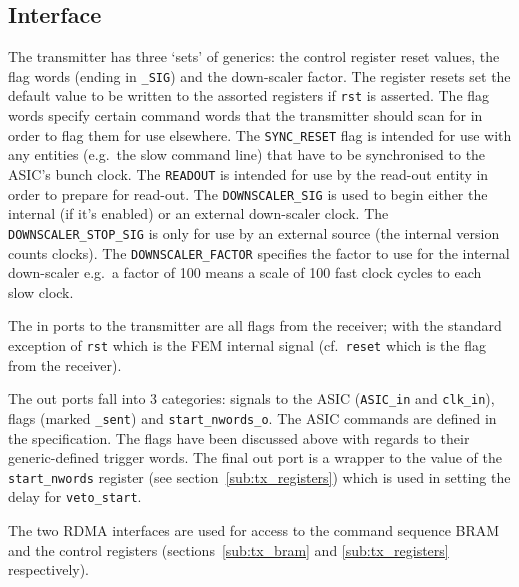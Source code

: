 \subsection{Interface} %
\label{sub:tx_interface}
The transmitter has three `sets' of generics: the control register reset values, the flag words (ending in \texttt{\_SIG}) and the down-scaler factor. The register resets set the default value to be written to the assorted registers if \texttt{rst} is asserted. The flag words specify certain command words that the transmitter should scan for in order to flag them for use elsewhere. The \texttt{SYNC\_RESET} flag is intended for use with any entities (e.g.\ the slow command line) that have to be synchronised to the ASIC's bunch clock. The \texttt{READOUT} is intended for use by the read-out entity in order to prepare for read-out. The \texttt{DOWNSCALER\_SIG} is used to begin either the internal (if it's enabled) or an external down-scaler clock. The \texttt{DOWNSCALER\_STOP\_SIG} is only for use by an external source (the internal version counts clocks). The \texttt{DOWNSCALER\_FACTOR} specifies the factor to use for the internal down-scaler e.g.\ a factor of 100 means a scale of 100 fast clock cycles to each slow clock.
    
The in ports to the transmitter are all flags from the receiver; with the standard exception of \texttt{rst} which is the FEM internal signal (cf.\ \texttt{reset} which is the flag from the receiver).
    
The out ports fall into 3 categories: signals to the ASIC (\texttt{ASIC\_in} and \texttt{clk\_in}), flags (marked \texttt{\_sent}) and \texttt{start\_nwords\_o}. The ASIC commands are defined in the specification. The flags have been discussed above with regards to their generic-defined trigger words. The final out port is a wrapper to the value of the \texttt{start\_nwords} register (see section~\ref{sub:tx_registers}) which is used in setting the delay for \texttt{veto\_start}.
    
The two RDMA interfaces are used for access to the command sequence BRAM and the control registers (sections~\ref{sub:tx_bram} and \ref{sub:tx_registers} respectively).
    
